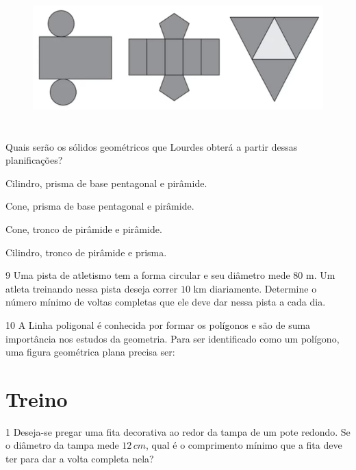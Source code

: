 \begin{figure}
\includegraphics[width=5.90625in,height=2.125in]{./imgSAEB_6_MAT/media/image51.png}
\end{figure}

Quais serão os sólidos geométricos que Lourdes obterá a partir dessas
planificações?

\begin{escolha}
\item Cilindro, prisma de base pentagonal e pirâmide.
\item Cone, prisma de base pentagonal e pirâmide.
\item Cone, tronco de pirâmide e pirâmide.
\item Cilindro, tronco de pirâmide e prisma.
\end{escolha}



\num{9}  Uma pista de atletismo tem a forma circular e seu diâmetro mede $80$ m.
Um atleta treinando nessa pista deseja correr $10$ km diariamente.
Determine o número mínimo de voltas completas que ele deve dar nessa
pista a cada dia.


\num{10} A Linha poligonal é conhecida por formar os polígonos e são de suma
importância nos estudos da geometria. Para ser identificado como um
polígono, uma figura geométrica plana precisa ser:


\section{Treino}

\num{1}  Deseja-se pregar uma fita decorativa ao redor da tampa de um pote
redondo. Se o diâmetro da tampa mede $12\,cm$, qual é o comprimento mínimo
que a fita deve ter para dar a volta completa nela?

